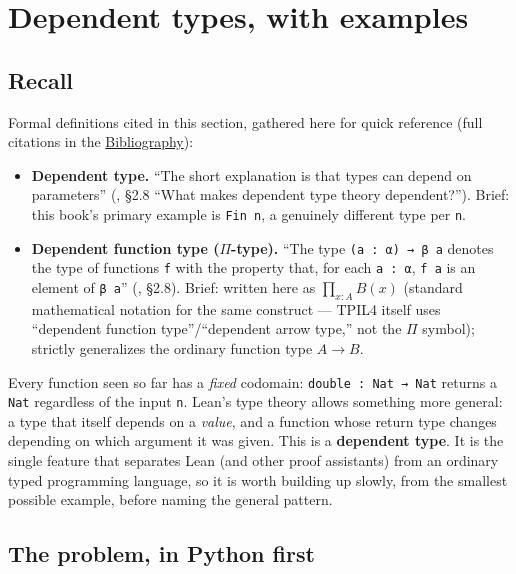 \section{Dependent types, with examples}\label{sec:01-basics:03-dependent-types:1}

\subsection{Recall}\label{sec:01-basics:03-dependent-types:2}

Formal definitions cited in this section, gathered here for quick reference (full citations in the \hyperref[sec:root:bibliography:1]{Bibliography}):

\begin{itemize}
\tightlist
\item
  \textbf{Dependent type.} ``The short explanation is that types can depend on parameters'' (\cite{TPIL4}, §2.8 ``What makes dependent type theory dependent?''). Brief: this book's primary example is \texttt{Fin n}, a genuinely different type per \texttt{n}.
\item
  \textbf{Dependent function type (\(\Pi\)-type).} ``The type \texttt{(a : α) → β a} denotes the type of functions \texttt{f} with the property that, for each \texttt{a : α}, \texttt{f a} is an element of \texttt{β a}'' (\cite{TPIL4}, §2.8). Brief: written here as \(\prod_{x:A} B(x)\) (standard mathematical notation for the same construct --- TPIL4 itself uses ``dependent function type''/``dependent arrow type,'' not the \(\Pi\) symbol); strictly generalizes the ordinary function type \(A \to B\).
\end{itemize}

Every function seen so far has a \emph{fixed} codomain: \texttt{double : Nat → Nat} returns a \texttt{Nat} regardless of the input \texttt{n}. Lean's type theory allows something more general: a type that itself depends on a \emph{value}, and a function whose return type changes depending on which argument it was given. This is a \textbf{dependent type}. It is the single feature that separates Lean (and other proof assistants) from an ordinary typed programming language, so it is worth building up slowly, from the smallest possible example, before naming the general pattern.

\subsection{The problem, in Python first}\label{sec:01-basics:03-dependent-types:3}

